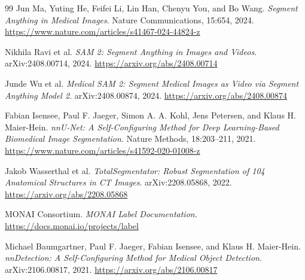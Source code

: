 \begin{thebibliography}{99}
Jun Ma, Yuting He, Feifei Li, Lin Han, Chenyu You, and Bo Wang.
\newblock \textit{Segment Anything in Medical Images}.
\newblock Nature Communications, 15:654, 2024.
\newblock \url{https://www.nature.com/articles/s41467-024-44824-z}

Nikhila Ravi et al.
\newblock \textit{SAM 2: Segment Anything in Images and Videos}.
\newblock arXiv:2408.00714, 2024.
\newblock \url{https://arxiv.org/abs/2408.00714}

Junde Wu et al.
\newblock \textit{Medical SAM 2: Segment Medical Images as Video via Segment Anything Model 2}.
\newblock arXiv:2408.00874, 2024.
\newblock \url{https://arxiv.org/abs/2408.00874}

Fabian Isensee, Paul F. Jaeger, Simon A. A. Kohl, Jens Petersen, and Klaus H. Maier-Hein.
\newblock \textit{nnU-Net: A Self-Configuring Method for Deep Learning-Based Biomedical Image Segmentation}.
\newblock Nature Methods, 18:203--211, 2021.
\newblock \url{https://www.nature.com/articles/s41592-020-01008-z}

Jakob Wasserthal et al.
\newblock \textit{TotalSegmentator: Robust Segmentation of 104 Anatomical Structures in CT Images}.
\newblock arXiv:2208.05868, 2022.
\newblock \url{https://arxiv.org/abs/2208.05868}

MONAI Consortium.
\newblock \textit{MONAI Label Documentation}.
\newblock \url{https://docs.monai.io/projects/label}

Michael Baumgartner, Paul F. Jaeger, Fabian Isensee, and Klaus H. Maier-Hein.
\newblock \textit{nnDetection: A Self-Configuring Method for Medical Object Detection}.
\newblock arXiv:2106.00817, 2021.
\newblock \url{https://arxiv.org/abs/2106.00817}

\end{thebibliography}
